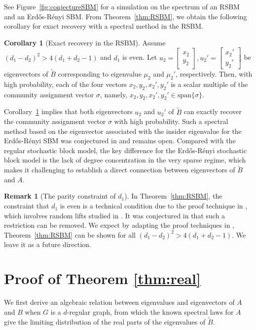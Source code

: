 \documentclass[11pt,reqno]{amsart}
\theoremstyle{definition}
\newtheorem{cor}[theorem]{Corollary}
\newtheorem{remark}[theorem]{Remark}
\begin{document}
See Figure~\ref{fig:conjectureSBM} for {a} simulation on the spectrum of an RSBM and an Erd\H{o}s-R\'{e}nyi SBM.
From Theorem~\ref{thm:RSBM}, we obtain the following corollary for exact recovery with a spectral method in the RSBM.
\begin{cor}[Exact recovery in the RSBM] \label{cor:recovery} Assume $(d_1-d_2)^2>4(d_1+d_2-1)$ and $d_1$ is even.
Let $u_2=\begin{bmatrix}
    x_2\\
    y_2
\end{bmatrix}, u_2'=\begin{bmatrix}
    x_2'\\
    y_2'
\end{bmatrix} $ be {eigenvectors} of $\tilde B$ corresponding to eigenvalue $\mu_2 $ and $\mu_2'$, {respectively}. Then, with high probability, each of the four vectors $x_2, y_2,x_2', y_2'$ is a scalar multiple of the community assignment {vector} $\sigma$, namely, $x_2, y_2,x_2', y_2' \in \mathrm{span}\{\sigma\} $.
\end{cor}
Corollary~\ref{cor:recovery} implies that both eigenvectors  $u_2$ and $u_2'$ of $\tilde B$ can exactly recover the community assignment vector $\sigma$ with high probability. Such a spectral method based on the eigenvector associated with the insider eigenvalue for the Erd\H{o}s-R\'{e}nyi SBM was conjectured in \cite{dall2019revisiting} and remains open. Compared with the regular stochastic block model, the key difference for the Erd\H{o}s-R\'{e}nyi stochastic block model is the lack of degree concentration in the very sparse regime, which makes it challenging to establish a direct connection between eigenvectors of $\tilde B$ and $A$.




\begin{remark}[The parity constraint of $d_1$]
  In Theorem~\ref{thm:RSBM}, the constraint that $d_1$ is even is a technical condition due to the proof technique in \cite{brito2015recovery}, which involves random lifts studied in \cite{bordenave2020new,friedman2014relativized}. It was conjectured in \cite{brito2015recovery} that such a restriction can be removed. We expect by adapting the  proof techniques in \cite{bordenave2020new,brito2021spectral}, Theorem~\ref{thm:RSBM} can {be} shown for all $(d_1-d_2)^2>4(d_1+d_2-1)$.  We leave it as a future direction.  
\end{remark}




\section{Proof of Theorem \ref{thm:real}}\label{sec:thm1}
{We first derive an algebraic relation between eigenvalues and eigenvectors of $A$ and $B$ when $G$ is a $d$-regular graph, from which the known spectral laws for $A$ give the limiting distribution of the real parts of the eigenvalues of $\tilde B$.}
\end{document}

